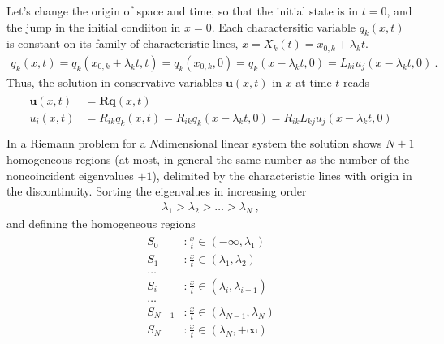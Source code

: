 \documentclass[letterpaper,10pt,english]{jupyterBook}
\begin{document}
\sphinxAtStartPar
Let’s change the origin of space and time, so that the initial state is in \(t=0\), and the jump in the initial condiiton in \(x = 0\). Each charactersitic variable \(q_k(x, t)\) is constant on its family of characteristic lines, \(x = X_k(t) = x_{0,k} + \lambda_k t\).
\begin{equation*}
\begin{split}q_k(x,t) = q_k(x_{0,k} + \lambda_k t, t) = q_k(x_{0,k}, 0) = q_k(x - \lambda_k t, 0) = L_{ki} u_j(x - \lambda_k t, 0) \ .\end{split}
\end{equation*}
\sphinxAtStartPar
Thus, the solution in conservative variables \(\mathbf{u}(x,t)\) in \(x\) at time \(t\) reads
\begin{equation*}
\begin{split}\begin{aligned}
  \mathbf{u}(x,t) & = \mathbf{R} \mathbf{q}(x,t) \\
  u_i(x,t) & = R_{ik} q_k(x,t) = R_{ik} q_k(x-\lambda_k t, 0) = R_{ik} L_{kj} u_j(x-\lambda_k t, 0) \\
\end{aligned}\end{split}
\end{equation*}
\sphinxAtStartPar
In a Riemann problem for a \(N\)\sphinxhyphen{}dimensional linear system the solution shows \(N+1\) homogeneous regions (at most, in general the same number as the number of the non\sphinxhyphen{}coincident eigenvalues \(+1\)), delimited by the characteristic lines with origin in the discontinuity. Sorting the eigenvalues in increasing order
\begin{equation*}
\begin{split}\lambda_1 > \lambda_2 > \dots > \lambda_N \ ,\end{split}
\end{equation*}
\sphinxAtStartPar
and defining the homogeneous regions
\begin{equation*}
\begin{split}\begin{aligned}
  S_0 & : \frac{x}{t} \in (-\infty, \lambda_1) \\
  S_1 & : \frac{x}{t} \in (\lambda_1, \lambda_2) \\
  \dots & \\
  S_i & : \frac{x}{t} \in (\lambda_i, \lambda_{i+1}) \\ 
  \dots & \\
  S_{N-1} & : \frac{x}{t} \in (\lambda_{N-1}, \lambda_{N}) \\ 
  S_{N}   & : \frac{x}{t} \in (\lambda_{N}, +\infty) \\ 
\end{aligned}\end{split}
\end{equation*}
\end{document}
